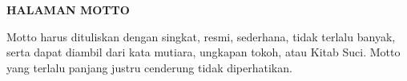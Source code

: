 \begin{center}
  {\bfseries HALAMAN MOTTO\par}
\end{center}

\noindent
Motto harus dituliskan dengan singkat, resmi, sederhana, tidak
terlalu banyak, serta dapat diambil dari kata mutiara, ungkapan
tokoh, atau Kitab Suci. Motto yang terlalu panjang justru
cenderung tidak diperhatikan.

\clearpage
